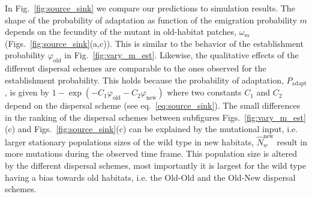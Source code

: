 \documentclass[a4paper,11pt]{article}
\newcommand{\chg}[1]{\textcolor{change}{#1}}
\begin{document}
In Fig.~\ref{fig:source_sink} we compare our predictions to simulation results. The shape of the probability of adaptation as function of the emigration probability $m$ depends on the fecundity of the mutant in old-habitat patches, $\omega_m$ (Figs.~\ref{fig:source_sink}(a,c)). This is similar to the behavior of the establishment probability $\varphi_{\text{old}}$ in Fig.~\ref{fig:vary_m_est}. Likewise, the qualitative effects of the different dispersal schemes are comparable to the ones observed for the establishment probability. \chg{This holds because the probability of adaptation, $P_{\text{adapt}}$, is given by $1-\exp(-C_1 \varphi_{\text{old}} -C_2 \varphi_{\text{new}})$ where two constants $C_1$ and $C_2$ depend on the dispersal scheme (see eq.~\eqref{eq:source_sink}). \linelabel{R2-35}The small differences in the ranking of the dispersal schemes between subfigures Figs.~\ref{fig:vary_m_est}(c) and Figs.~\ref{fig:source_sink}(c) can be explained by the mutational input, i.e. larger stationary populations sizes of the wild type in new habitats, $\widehat{N}_w^{\text{new}}$ result in more mutations during the observed time frame. This population size is altered by the different dispersal schemes, most importantly it is largest for the wild type having a bias towards old habitats, i.e. the Old-Old and the Old-New dispersal schemes.} 
\end{document}
